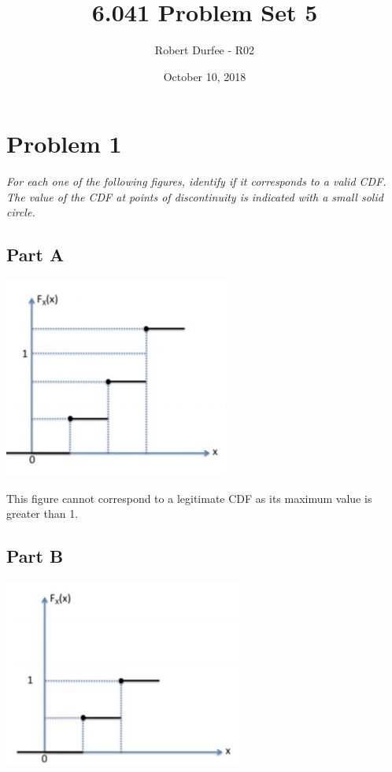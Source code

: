 \documentclass{article}
\title{6.041 Problem Set 5}
\author{Robert Durfee - R02}
\date{October 10, 2018}
\begin{document}
\maketitle

\section*{Problem 1}

\textit{For each one of the following figures, identify if it corresponds to
a valid CDF. The value of the CDF at points of discontinuity is indicated
with a small solid circle.}

\subsection*{Part A}

\begin{center}
    \includegraphics[scale=1]{Images/P1A.PNG}
\end{center}

This figure cannot correspond to a legitimate CDF as its maximum value is
greater than 1.

\subsection*{Part B}

\begin{center}
    \includegraphics[scale=1]{Images/P1B.PNG}
\end{center}
\end{document}
